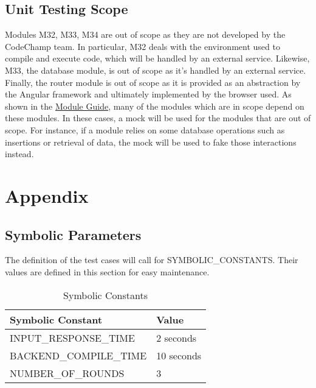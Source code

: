 \documentclass[12pt, titlepage]{article}
\begin{document}
 \subsection{Unit Testing Scope}\label{scope}

Modules M32, M33, M34 are out of scope as they are not developed by the CodeChamp team. In particular, M32 deals with the environment used to compile and execute code, which will be handled by an external service. Likewise, M33, the database module, is out of scope as it's handled by an external service. Finally, the router module is out of scope as it is provided as an abstraction by the Angular framework and ultimately implemented by the browser used. As shown in the \href{https://github.com/Tamas-Leung/CodeChamp/blob/main/docs/Design/MG/MG.pdf}{Module Guide}, many of the modules which are in scope depend on these modules. In these cases, a mock will be used for the modules that are out of scope. For instance, if a module relies on some database operations such as insertions or retrieval of data, the mock will be used to fake those interactions instead.
				




\newpage

\section{Appendix}

\subsection{Symbolic Parameters}

The definition of the test cases will call for SYMBOLIC\_CONSTANTS.
Their values are defined in this section for easy maintenance.

\begin{table}[H]
    \begin{tabularx}{\textwidth}{ | p{6cm} | p{6.85cm} | }
    \hline
    Symbolic Constant & Value \\
    \hline
    INPUT\_RESPONSE\_TIME & 2 seconds \\
    \hline
    BACKEND\_COMPILE\_TIME & 10 seconds \\
    \hline
    NUMBER\_OF\_ROUNDS & 3 \\
    \hline
    \end{tabularx}
    \caption{Symbolic Constants}
    \label{tab:trace}
\end{table}
\end{document}

